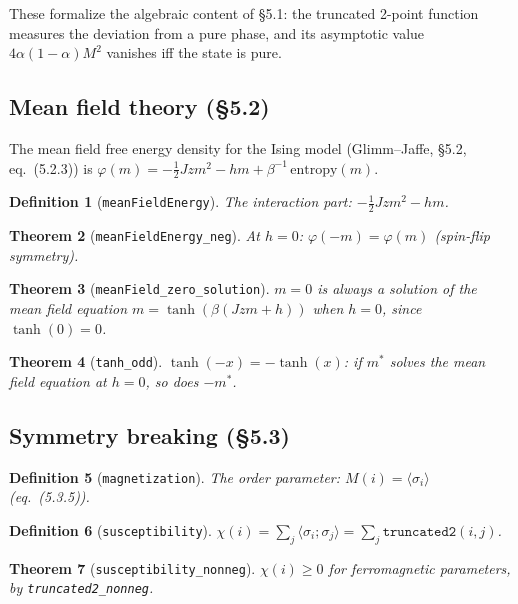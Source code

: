 \documentclass[a4paper,11pt]{article}
\newtheorem{theorem}{Theorem}
\newtheorem{definition}[theorem]{Definition}
\begin{document}
These formalize the algebraic content of \S5.1: the truncated 2-point
function measures the deviation from a pure phase, and
its asymptotic value $4\alpha(1-\alpha)M^2$ vanishes iff the state is pure.

\subsection{Mean field theory (\S5.2)}

The mean field free energy density for the Ising model
(Glimm--Jaffe, \S5.2, eq.~(5.2.3)) is
$\varphi(m) = -\frac{1}{2}Jzm^2 - hm + \beta^{-1}\,\mathrm{entropy}(m)$.

\begin{definition}[\texttt{meanFieldEnergy}]
The interaction part: $-\frac{1}{2}Jzm^2 - hm$.
\end{definition}

\begin{theorem}[\texttt{meanFieldEnergy\_neg}]
At $h = 0$: $\varphi(-m) = \varphi(m)$ (spin-flip symmetry).
\end{theorem}

\begin{theorem}[\texttt{meanField\_zero\_solution}]
$m = 0$ is always a solution of the mean field equation
$m = \tanh(\beta(Jzm + h))$ when $h = 0$, since $\tanh(0) = 0$.
\end{theorem}

\begin{theorem}[\texttt{tanh\_odd}]
$\tanh(-x) = -\tanh(x)$: if $m^*$ solves the mean field equation
at $h = 0$, so does $-m^*$.
\end{theorem}

\subsection{Symmetry breaking (\S5.3)}

\begin{definition}[\texttt{magnetization}]
The order parameter: $M(i) = \langle\sigma_i\rangle$ (eq.~(5.3.5)).
\end{definition}

\begin{definition}[\texttt{susceptibility}]
$\chi(i) = \sum_j \langle\sigma_i;\sigma_j\rangle = \sum_j \texttt{truncated2}(i,j)$.
\end{definition}

\begin{theorem}[\texttt{susceptibility\_nonneg}]
$\chi(i) \ge 0$ for ferromagnetic parameters, by \texttt{truncated2\_nonneg}.
\end{theorem}
\end{document}
